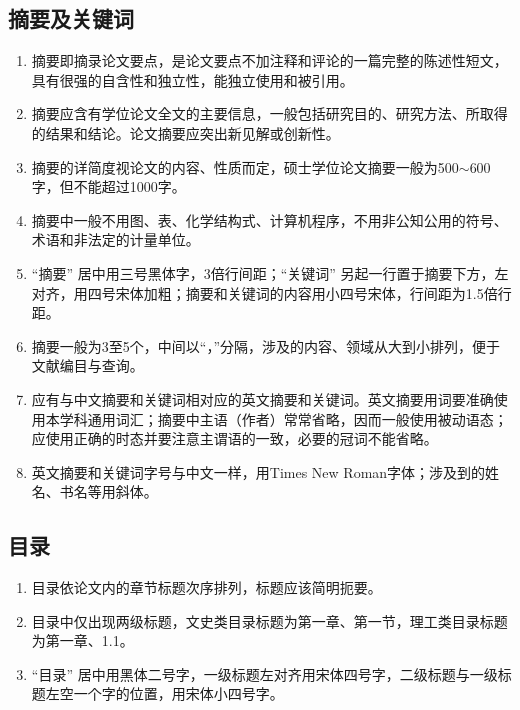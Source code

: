 \subsection{摘要及关键词}

\begin{enumerate}[label=\arabic*)]
	\item 摘要即摘录论文要点，是论文要点不加注释和评论的一篇完整的陈述性短文，具有很强的自含性和独立性，能独立使用和被引用。
	
	\item 摘要应含有学位论文全文的主要信息，一般包括研究目的、研究方法、所取得的结果和结论。论文摘要应突出新见解或创新性。
	
	\item 摘要的详简度视论文的内容、性质而定，硕士学位论文摘要一般为500$\sim$600字，但不能超过1000字。
	
	\item 摘要中一般不用图、表、化学结构式、计算机程序，不用非公知公用的符号、术语和非法定的计量单位。
	
	\item “摘要” 居中用三号黑体字，3倍行间距；“关键词” 另起一行置于摘要下方，左对齐，用四号宋体加粗；摘要和关键词的内容用小四号宋体，行间距为1.5倍行距。
	
	\item 摘要一般为3至5个，中间以“，”分隔，涉及的内容、领域从大到小排列，便于文献编目与查询。
	
	\item 应有与中文摘要和关键词相对应的英文摘要和关键词。英文摘要用词要准确使用本学科通用词汇；摘要中主语（作者）常常省略，因而一般使用被动语态；应使用正确的时态并要注意主谓语的一致，必要的冠词不能省略。
	
	\item 英文摘要和关键词字号与中文一样，用Times New Roman字体；涉及到的姓名、书名等用斜体。
\end{enumerate}

\subsection{目录}

\begin{enumerate}[label=\arabic*)]
	\item 目录依论文内的章节标题次序排列，标题应该简明扼要。
	
	\item 目录中仅出现两级标题，文史类目录标题为第一章、第一节，理工类目录标题为第一章、1.1。
	
	\item “目录” 居中用黑体二号字，一级标题左对齐用宋体四号字，二级标题与一级标题左空一个字的位置，用宋体小四号字。

\end{enumerate}

